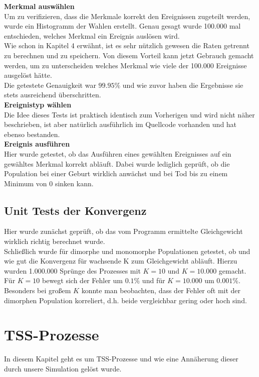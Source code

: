 \documentclass[11pt, a4paper, german]{article}
\theoremstyle{plain}
\begin{document}
	\textbf{Merkmal auswählen}\\
	Um zu verifizieren, dass die Merkmale korrekt den Ereignissen zugeteilt werden, wurde ein Histogramm der Wahlen erstellt. Genau gesagt wurde 100.000 mal entschieden, welches Merkmal ein Ereignis auslösen wird.\\
	Wie schon in Kapitel 4 erwähnt, ist es sehr nützlich gewesen die Raten getrennt zu berechnen und zu speichern. Von diesem Vorteil kann jetzt Gebrauch gemacht werden, um zu unterscheiden welches Merkmal wie viele der 100.000 Ereignisse ausgelöst hätte.\\
	Die getestete Genauigkeit war $ 99.95\% $ und wie zuvor haben die Ergebnisse sie stets ausreichend überschritten.\\
	
	\textbf{Ereignistyp wählen}\\
	Die Idee dieses Tests ist praktisch identisch zum Vorherigen und wird nicht näher beschrieben, ist aber natürlich ausführlich im Quellcode vorhanden und hat ebenso bestanden.\\
	
	\textbf{Ereignis ausführen}\\
	Hier wurde getestet, ob das Ausführen eines gewählten Ereignisses auf ein gewähltes Merkmal korrekt abläuft. Dabei wurde lediglich geprüft, ob die Population bei einer Geburt wirklich anwächst und bei Tod bis zu einem Minimum von 0 sinken kann.
	
	\subsection{Unit Tests der Konvergenz}
	Hier wurde zunächst geprüft, ob das vom Programm ermittelte Gleichgewicht wirklich richtig berechnet wurde.\\
	Schließlich wurde für dimorphe und monomorphe Populationen getestet, ob und wie gut die Konvergenz für wachsende K zum Gleichgewicht abläuft. Hierzu wurden 1.000.000 Sprünge des Prozesses mit $ K = 10 $ und $ K = 10.000 $ gemacht. Für $ K = 10 $ bewegt sich der Fehler um $ 0.1\% $ und für $ K = 10.000 $ um $ 0.001\% $. Besonders bei großem $ K $ konnte man beobachten, dass der Fehler oft mit der dimorphen Population korreliert, d.h. beide vergleichbar gering oder hoch sind.
	
\clearpage	
\section{TSS-Prozesse}
In diesem Kapitel geht es um TSS-Prozesse und wie eine Annäherung dieser durch unsere Simulation gelöst wurde.
\end{document}
